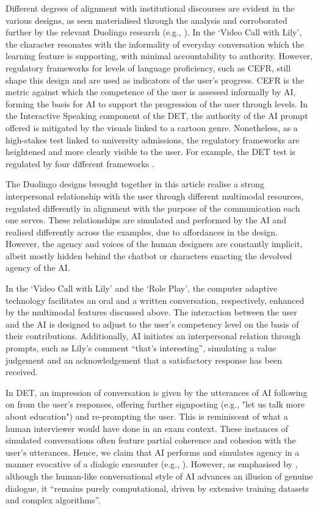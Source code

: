 \documentclass[english]{textolivre}
\begin{document}
Different degrees of alignment with institutional discourses are evident in the various designs, as seen materialised through the analysis and corroborated further by the relevant Duolingo research (e.g., \textcite{burstein2022theoretical,park2025assessing}). In the ‘Video Call with Lily’, the character resonates with the informality of everyday conversation which the learning feature is supporting, with minimal accountability to authority. However, regulatory frameworks for levels of language proficiency, such as CEFR, still shape this design and are used as indicators of the user’s progress. CEFR is the metric against which the competence of the user is assessed informally by AI, forming the basis for AI to support the progression of the user through levels. In the Interactive Speaking component of the DET, the authority of the AI prompt offered is mitigated by the visuals linked to a cartoon genre. Nonetheless, as a high-stakes test linked to university admissions, the regulatory frameworks are heightened and more clearly visible to the user. For example, the DET test is regulated by four different frameworks \cite{burstein2022theoretical}.

The Duolingo designs brought together in this article realise a strong interpersonal relationship with the user through different multimodal resources, regulated differently in alignment with the purpose of the communication each one serves. These relationships are simulated and performed by the AI and realised differently across the examples, due to affordances in the design. However, the agency and voices of the human designers are constantly implicit, albeit mostly hidden behind the chatbot or characters enacting the devolved agency of the AI.

In the ‘Video Call with Lily’ and the ‘Role Play’, the computer adaptive technology facilitates an oral and a written conversation, respectively, enhanced by the multimodal features discussed above. The interaction between the user and the AI is designed to adjust to the user’s competency level on the basis of their contributions. Additionally, AI initiates an interpersonal relation through prompts, such as Lily’s comment “that’s interesting”, simulating a value judgement and an acknowledgement that a satisfactory response has been received.

In DET, an impression of conversation is given by the utterances of AI following on from the user’s responses, offering further signposting (e.g., "let us talk more about education") and re-prompting the user. This is reminiscent of what a human interviewer would have done in an exam context. These instances of simulated conversations often feature partial coherence and cohesion with the user’s utterances. Hence, we claim that AI performs and simulates agency in a manner evocative of a dialogic encounter (e.g., \textcite{duquepereira2025chatbots,tang2025dialogic}). However, as emphasised by \textcite[p. 3]{zappavigna2025emoji}, although the human-like conversational style of AI advances an illusion of genuine dialogue, it “remains purely computational, driven by extensive training datasets and complex algorithms”.
\end{document}
